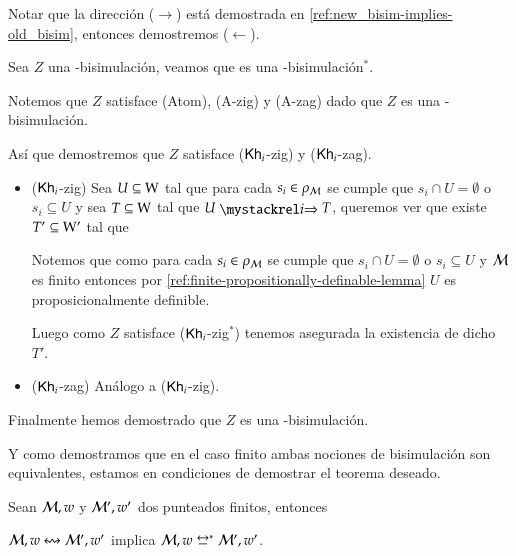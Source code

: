 \begin{demostracion}
    Notar que la dirección ($\rightarrow$) está demostrada en \ref{ref:new_bisim-implies-old_bisim}, entonces demostremos ($\leftarrow$).
    
    Sea $Z$ una \KHilogic-bisimulación, veamos que es una \KHilogic-bisimulación$^*$.

    Notemos que $Z$ satisface (Atom), (A-zig) y (A-zag) dado que $Z$ es una \KHilogic-bisimulación.

    Así que demostremos que $Z$ satisface ($\mathsf{Kh}_i$-zig) y ($\mathsf{Kh}_i$-zag).

    \begin{itemize}
        \item ($\mathsf{Kh}_i$-zig) Sea $U \subseteq \mathrm{W}$ tal que para cada $s_i \in \rho_{\mathcal{M}}$ se cumple que $s_i \cap U = \emptyset$ o $s_i \subseteq U$ 
        y sea $T \subseteq \mathrm{W}$ tal que $U \ultsExecAgi T$, queremos ver que existe $T' \subseteq \mathrm{W}'$ tal que

        \begin{multicols}{2}
        \end{multicols}

        Notemos que como para cada $s_i \in \rho_{\mathcal{M}}$ se cumple que $s_i \cap U = \emptyset$ o $s_i \subseteq U$ y $\mathcal{M}$ es finito entonces 
        por \ref{ref:finite-propositionally-definable-lemma} $U$ es proposicionalmente definible.
    
        Luego como $Z$ satisface ($\mathsf{Kh}_i$-zig$^*$) tenemos asegurada la existencia de dicho $T'$.
    
        \item ($\mathsf{Kh}_i$-zag) Análogo a ($\mathsf{Kh}_i$-zig). 
    \end{itemize}

    Finalmente hemos demostrado que $Z$ es una \KHilogic-bisimulación.
\end{demostracion}

Y como demostramos que en el caso finito ambas nociones de bisimulación son equivalentes, estamos en condiciones de demostrar el teorema deseado. 

\begin{teorema}
    Sean $\mathcal{M},w$ y $\mathcal{M}',w'$ dos \ultss punteados finitos, entonces
    \begin{center}
        $\mathcal{M},w \mathrel{\leftrightsquigarrow} \mathcal{M}', w'$ implica $\model,w \bisim^* \model', w'$.
    \end{center}
\end{teorema}

